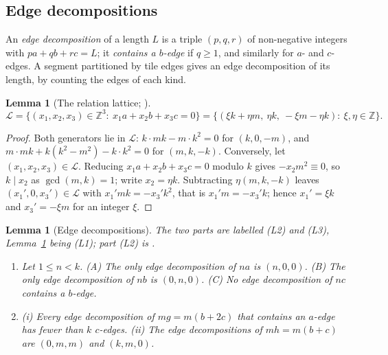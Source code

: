 \documentclass[11pt]{amsart}
\newtheorem{lemma}[theorem]{Lemma}
\theoremstyle{remark}
\newcommand{\Z}{\mathbb{Z}}
\begin{document}
\subsection{Edge decompositions}

An \emph{edge decomposition} of a length $L$ is a triple $(p,q,r)$ of non-negative integers with $pa+qb+rc=L$; it \emph{contains a $b$-edge} if $q\ge1$, and similarly for $a$- and $c$-edges. A segment partitioned by tile edges gives an edge decomposition of its length, by counting the edges of each kind.

\begin{lemma}[The relation lattice; {\cite[Lemma~28]{BR}}]\label{app:lattice}
\[
\mathcal{L}=\{(x_1,x_2,x_3)\in\Z^3:\ x_1a+x_2b+x_3c=0\}
=\{(\xi k+\eta m,\ \eta k,\ -\xi m-\eta k):\ \xi,\eta\in\Z\}.
\]
\end{lemma}

\begin{proof}
Both generators lie in $\mathcal{L}$: $k\cdot mk-m\cdot k^2=0$ for $(k,0,-m)$, and $m\cdot mk+k(k^2-m^2)-k\cdot k^2=0$ for $(m,k,-k)$. Conversely, let $(x_1,x_2,x_3)\in\mathcal{L}$. Reducing $x_1a+x_2b+x_3c=0$ modulo $k$ gives $-x_2m^2\equiv0$, so $k\mid x_2$ as $\gcd(m,k)=1$; write $x_2=\eta k$. Subtracting $\eta(m,k,-k)$ leaves $(x_1',0,x_3')\in\mathcal{L}$ with $x_1'mk=-x_3'k^2$, that is $x_1'm=-x_3'k$; hence $x_1'=\xi k$ and $x_3'=-\xi m$ for an integer $\xi$.
\end{proof}

\begin{lemma}[Edge decompositions]\label{app:decomp}
The two parts are labelled (L2) and (L3), Lemma~\ref{app:lattice} being (L1); part (L2) is \cite[Lemma~30\,(A)--(C)]{BR}.
\begin{enumerate}
\item[(L2)] Let $1\le n<k$. \textup{(A)} The only edge decomposition of $na$ is $(n,0,0)$. \textup{(B)} The only edge decomposition of $nb$ is $(0,n,0)$. \textup{(C)} No edge decomposition of $nc$ contains a $b$-edge.
\item[(L3)] \textup{(i)} Every edge decomposition of $mg=m(b+2c)$ that contains an $a$-edge has fewer than $k$ $c$-edges. \textup{(ii)} The edge decompositions of $mh=m(b+c)$ are $(0,m,m)$ and $(k,m,0)$.
\end{enumerate}
\end{lemma}
\end{document}
